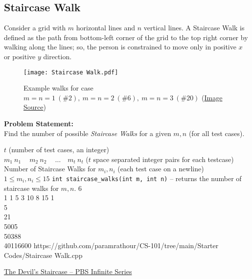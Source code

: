 \documentclass[../../Problems]{subfiles}
\begin{document}
\subsection{Staircase Walk}{\label{pp:staircasewalk}}
Consider a grid with $m$ horizontal lines and $n$ vertical lines. A Staircase Walk is defined as the path from bottom-left corner of the grid to the top right corner by walking along the lines; so, the person is constrained to move only in positive $x$ or positive $y$ direction.
\begin{figure}[H]
	\centering
	\texttt{[image: Staircase Walk.pdf]}
	\caption{Example walks for case $m=n=1\ (\#2),\ m=n=2\ (\#6),\ m=n=3\ (\#20)$ (\href{https://mathworld.wolfram.com/StaircaseWalk.html}{Image Source})}
	\label{fig:staircasewalk}
\end{figure}
\vspace{-1em}
\textbf{Problem Statement:}\\
Find the number of possible \emph{Staircase Walks} for a given $m,n$ (for all test cases).
\begin{testcasesFunction}
	{$t$ \hfill(number of test cases, an integer)\\
	$m_1\ n_1\ \quad m_2\ n_2\ \quad \ldots\quad m_t\ n_t$ \hfill($t$ space separated integer pairs for each testcase)}
	{Number of Staircase Walks for $m_i, n_i$  \hfill(each test case on a newline)}
	{$1 \leq m_i, n_i \leq 15$}
	{\texttt{int staircase\_walks(int m, int n)} -- returns the number of staircase walks for $m,n$.}
	{6\\1 1 5 3 10 8 15}
	{1\\5\\21\\5005\\50388\\40116600}
	{https://github.com/paramrathour/CS-101/tree/main/Starter Codes/Staircase Walk.cpp}
\end{testcasesFunction}
\begin{funvideo}
\href{https://youtu.be/dQXVn7pFsVI}{The Devil's Staircase -- PBS Infinite Series}
\end{funvideo}
\end{document}

